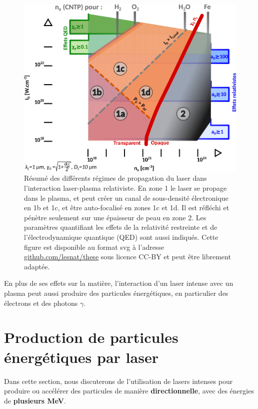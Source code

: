 \begin{refsection}
\begin{figure}[hbtp]
    \centering
    \includegraphics[width=0.8\linewidth]{2-laser/laser_plasma_zones.png}
    \caption{Résumé des différents régimes de propagation du laser dans l'interaction laser-plasma relativiste. En zone 1 le laser se propage dans le plasma, et peut créer un canal de sous-densité électronique en 1b et 1c, et être auto-focalisé en zones 1c et 1d. Il est réfléchi et pénètre seulement sur une épaisseur de peau en zone 2. Les paramètres quantifiant les effets de la relativité restreinte et de l'électrodynamique quantique (QED) sont aussi indiqués. Cette figure est disponible au format svg à l'adresse \url{github.com/lesnat/these} sous licence CC-BY et peut être librement adaptée.}
    \label{fig:2-regimes_plasma}
\end{figure}

En plus de ses effets sur la matière, l'interaction d'un laser intense avec un plasma peut aussi produire des particules énergétiques, en particulier des électrons et des photons $\gamma$.

\section{Production de particules énergétiques par laser}

Dans cette section, nous discuterons de l'utilisation de lasers intenses pour produire ou accélérer des particules de manière \textbf{directionnelle}, avec des énergies de \textbf{plusieurs MeV}.


\end{refsection}
